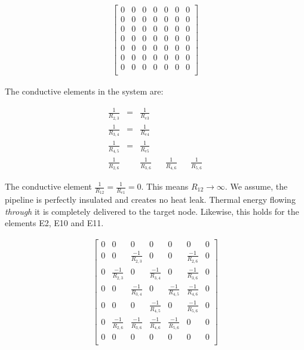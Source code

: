 \begin{equation}
	\begin{aligned}
		\begin{bmatrix}
			0 & 0 & 0 & 0 & 0 & 0 & 0\\
			0 & 0 & 0 & 0 & 0 & 0 & 0\\
			0 & 0 & 0 & 0 & 0 & 0 & 0\\
			0 & 0 & 0 & 0 & 0 & 0 & 0\\
			0 & 0 & 0 & 0 & 0 & 0 & 0\\
			0 & 0 & 0 & 0 & 0 & 0 & 0\\
			0 & 0 & 0 & 0 & 0 & 0 & 0\\
		\end{bmatrix}
	\end{aligned}
\end{equation}

The conductive elements in the system are:

\begin{equation}
	\begin{aligned}
        \frac{1}{R_{2,3}} & = & \frac{1}{R_{e3}} \\
        \frac{1}{R_{3,4}} & = & \frac{1}{R_{e4}} \\
        \frac{1}{R_{4,5}} & = & \frac{1}{R_{e5}} \\
        \frac{1}{R_{2,6}} &  & \frac{1}{R_{3,6}} & & \frac{1}{R_{4,6}} & & \frac{1}{R_{5,6}} 
	\end{aligned}
\end{equation}

The conductive element $\frac{1}{R_{12}} = \frac{1}{R_{e1}} = 0$. This means $R_{12} \rightarrow \infty$. We assume, the pipeline is perfectly insulated and creates no heat leak. Thermal energy flowing \emph{through} it is completely delivered to the target node. Likewise, this holds for the elements E2, E10 and E11.

\begin{equation}
	\begin{aligned}
		\begin{bmatrix}
			0 & 0 & 0 & 0 & 0 & 0 & 0\\
            0 & 0 & \frac{-1}{R_{2,3}} & 0 & 0 & \frac{-1}{R_{2,6}} & 0 \\
            0 & \frac{-1}{R_{2,3}} & 0 & \frac{-1}{R_{3,4}} & 0 & \frac{-1}{R_{3,6}} & 0\\
            0 & 0 & \frac{-1}{R_{3,4}} & 0 & \frac{-1}{R_{4,5}} & \frac{-1}{R_{4,6}} & 0\\
            0 & 0 & 0 & \frac{-1}{R_{4,5}} & 0 & \frac{-1}{R_{5,6}} & 0 \\
            0 & \frac{-1}{R_{2,6}} & \frac{-1}{R_{3,6}} & \frac{-1}{R_{4,6}} & \frac{-1}{R_{5,6}} & 0 & 0\\
            0 & 0 & 0 & 0 & 0 & 0 & 0\\
		\end{bmatrix}
	\end{aligned}
\end{equation}

